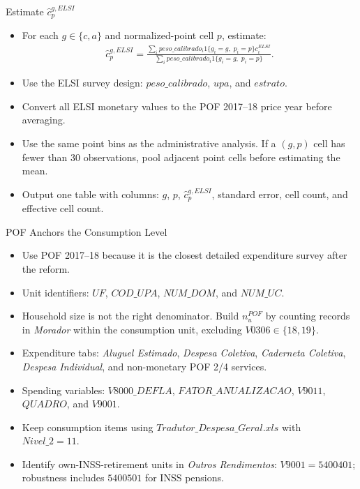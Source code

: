 \begin{frame}[label=elsiProfile]{Estimate \texorpdfstring{$\widehat c^{g,ELSI}_{p}$}{c-hat by group and points}}
    \small
    \begin{itemize}
        \item For each $g\in\{c,a\}$ and normalized-point cell $p$, estimate:
        \begin{align*}
            \widehat c^{g,ELSI}_{p}
            =
            \frac{
            \sum_i peso\_calibrado_i
            1\{g_i=g,\;p_i=p\}c_i^{ELSI}
            }{
            \sum_i peso\_calibrado_i
            1\{g_i=g,\;p_i=p\}
            }.
        \end{align*}
        \item Use the ELSI survey design: $peso\_calibrado$, $upa$, and $estrato$.
        \item Convert all ELSI monetary values to the POF 2017--18 price year before averaging.
        \item Use the same point bins as the administrative analysis. If a $(g,p)$ cell has fewer than 30 observations, pool adjacent point cells before estimating the mean.
        \item Output one table with columns: $g$, $p$, $\widehat c^{g,ELSI}_{p}$, standard error, cell count, and effective cell count.
    \end{itemize}
\end{frame}

\begin{frame}[label=pofLevel]{POF Anchors the Consumption Level}
    \footnotesize
    \begin{itemize}
        \item Use POF 2017--18 because it is the closest detailed expenditure survey after the reform.
        \item Unit identifiers: $UF$, $COD\_UPA$, $NUM\_DOM$, and $NUM\_UC$.
        \item Household size is not the right denominator. Build $n_u^{POF}$ by counting records in \textit{Morador} within the consumption unit, excluding $V0306\in\{18,19\}$.
        \item Expenditure tabs: \textit{Aluguel Estimado}, \textit{Despesa Coletiva}, \textit{Caderneta Coletiva}, \textit{Despesa Individual}, and non-monetary POF 2/4 services.
        \item Spending variables: $V8000\_DEFLA$, $FATOR\_ANUALIZACAO$, $V9011$, $QUADRO$, and $V9001$.
        \item Keep consumption items using $Tradutor\_Despesa\_Geral.xls$ with $Nivel\_2=11$.
        \item Identify own-INSS-retirement units in \textit{Outros Rendimentos}: $V9001=5400401$; robustness includes $5400501$ for INSS pensions.
    \end{itemize}
\end{frame}

